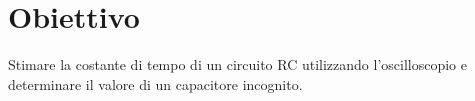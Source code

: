\section{Obiettivo}

Stimare la costante di tempo di un circuito RC utilizzando l'oscilloscopio e determinare il valore di un capacitore incognito. 